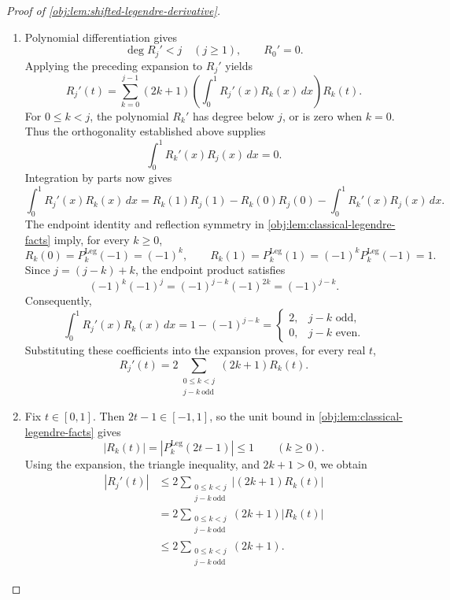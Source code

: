 \begin{proof}[Proof of \cref{obj:lem:shifted-legendre-derivative}]
\begin{enumerate}
\item Polynomial differentiation gives
\[
\deg R_j'<j\quad(j\ge1),
\qquad R_0'=0.
\]
Applying the preceding expansion to \(R_j'\) yields
\[
R_j'(t)=
\sum_{k=0}^{j-1}(2k+1)
\left(\int_0^1R_j'(x)R_k(x)\,dx\right)R_k(t).
\]
For \(0\le k<j\), the polynomial \(R_k'\) has degree below \(j\), or is zero when \(k=0\). Thus the orthogonality established above supplies
\[
\int_0^1R_k'(x)R_j(x)\,dx=0.
\]
Integration by parts now gives
\[
\int_0^1R_j'(x)R_k(x)\,dx
=
R_k(1)R_j(1)-R_k(0)R_j(0)
-\int_0^1R_k'(x)R_j(x)\,dx.
\]
The endpoint identity and reflection symmetry in
\cref{obj:lem:classical-legendre-facts} imply, for every \(k\ge0\),
\[
R_k(0)=P_k^{\mathrm{Leg}}(-1)=(-1)^k,
\qquad
R_k(1)=P_k^{\mathrm{Leg}}(1)
=(-1)^kP_k^{\mathrm{Leg}}(-1)=1.
\]
Since \(j=(j-k)+k\), the endpoint product satisfies
\[
(-1)^k(-1)^j=(-1)^{j-k}(-1)^{2k}=(-1)^{j-k}.
\]
Consequently,
\[
\int_0^1R_j'(x)R_k(x)\,dx
=1-(-1)^{j-k}
=
\begin{cases}
2,&j-k\text{ odd},\\
0,&j-k\text{ even}.
\end{cases}
\]
Substituting these coefficients into the expansion proves, for every real \(t\),
\[
R_j'(t)=
2\sum_{\substack{0\le k<j\\j-k\ \mathrm{odd}}}(2k+1)R_k(t).
\]

\item Fix \(t\in[0,1]\). Then \(2t-1\in[-1,1]\), so the unit bound in \cref{obj:lem:classical-legendre-facts} gives
\[
|R_k(t)|=|P_k^{\mathrm{Leg}}(2t-1)|\le1
\qquad(k\ge0).
\]
Using the expansion, the triangle inequality, and \(2k+1>0\), we obtain
\[
\begin{aligned}
|R_j'(t)|
&\le
2\sum_{\substack{0\le k<j\\j-k\ \mathrm{odd}}}
|(2k+1)R_k(t)|\\
&=
2\sum_{\substack{0\le k<j\\j-k\ \mathrm{odd}}}
(2k+1)|R_k(t)|\\
&\le
2\sum_{\substack{0\le k<j\\j-k\ \mathrm{odd}}}(2k+1).
\end{aligned}
\]


\end{enumerate}
\end{proof}
